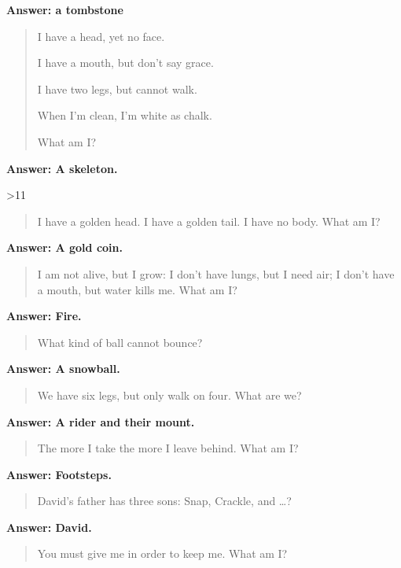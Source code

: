 \begin{multicols}{2}
  \textbf{Answer: a tombstone}

  \begin{quotation}
    I have a head, yet no face.

    I have a mouth, but don't say grace.

    I have two legs, but cannot walk.

    When I'm clean, I'm white as chalk.

    What am I?
  \end{quotation}

  \textbf{Answer: A skeleton.}
\fi

\ifnum\month>11

\begin{quotation}
I have a golden head. I have a golden tail. I have no body.
What am I?
\end{quotation}

\textbf{Answer: A gold coin.}


\begin{quotation}
I am not alive, but I grow: I don't have lungs, but I need air; I don't have a mouth, but water kills me.
What am I?
\end{quotation}

\textbf{Answer: Fire.}

\begin{quotation}
What kind of ball cannot bounce?
\end{quotation}

\textbf{Answer: A snowball.}

\fi

\begin{quotation}

  We have six legs, but only walk on four.
  What are we?

\end{quotation}

\textbf{Answer: A rider and their mount.}


\begin{quotation}
  The more I take the more I leave behind.
  What am I?
\end{quotation}

\textbf{Answer: Footsteps.}

\begin{quotation}
  David's father has three sons: Snap, Crackle, and  \ldots?
\end{quotation}

\textbf{Answer: David.}

\begin{quotation}
You must give me in order to keep me.
What am I? 
\end{quotation}


\end{multicols}
